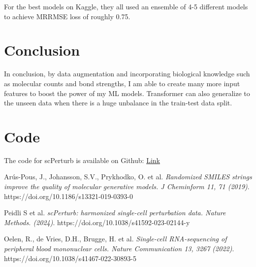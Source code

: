 \documentclass[11pt, oneside]{article}   	%
\begin{document}
For the best models on Kaggle, they all used an ensemble of 4-5 different models to achieve MRRMSE loss of roughly 0.75. 



\section*{Conclusion}

In conclusion, by data augmentation and incorporating biological knowledge such as molecular counts and bond strengths, I am able to create many more input features to boost the power of my ML models. Transformer can also generalize to the unseen data when there is a huge unbalance in the train-test data split. 




\section*{Code}

The code for scPerturb is available on Github: 
\href{https://github.com/tigeryi1998/scPerturb}{Link}





\begin{thebibliography}{9}

Arús-Pous, J., Johansson, S.V., Prykhodko, O. et al.
\textit{Randomized SMILES strings improve the quality of molecular generative models. J Cheminform 11, 71 (2019)}. https://doi.org/10.1186/s13321-019-0393-0


Peidli S et al.
\textit{scPerturb: harmonized single-cell perturbation data. Nature Methods. (2024)}.
https://doi.org/10.1038/s41592-023-02144-y


Oelen, R., de Vries, D.H., Brugge, H. et al.
\textit{Single-cell RNA-sequencing of peripheral blood mononuclear cells. Nature Communication 13, 3267 (2022)}.
https://doi.org/10.1038/s41467-022-30893-5





\end{thebibliography}
\end{document}
